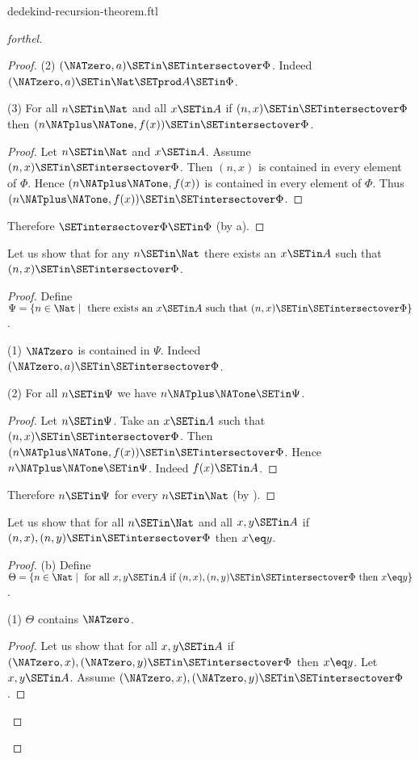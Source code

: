 \documentclass{stex}
\begin{document}
\begin{smodule}{dedekind-recursion-theorem.ftl}
\begin{proof}[forthel]
\begin{proof}
    (2) $(\NATzero, a) \SETin \SETintersectover \Phi$.
    Indeed $(\NATzero, a) \SETin \Nat \SETprod A \SETin \Phi$.

    (3) For all $n \SETin \Nat$ and all $x \SETin A$ if $(n, x) \SETin
    \SETintersectover \Phi$ then $(n \NATplus \NATone, f(x)) \SETin \SETintersectover \Phi$.
    \begin{proof}
      Let $n \SETin \Nat$ and $x \SETin A$.
      Assume $(n, x) \SETin \SETintersectover \Phi$.
      Then $(n, x)$ is contained in every element of $\Phi$.
      Hence $(n \NATplus \NATone, f(x))$ is contained in every element of $\Phi$.
      Thus $(n \NATplus \NATone, f(x)) \SETin \SETintersectover \Phi$.
    \end{proof}

    Therefore $\SETintersectover \Phi \SETin \Phi$ (by a).
  \end{proof}

  Let us show that for any $n \SETin \Nat$ there exists an $x \SETin A$ such
  that $(n, x) \SETin \SETintersectover \Phi$.
  \begin{proof}
    Define $\Psi = \{ n \in \Nat \mid \text{ there exists an }x \SETin A\text{ such
    that }(n, x) \SETin \SETintersectover \Phi \}$.

    (1) $\NATzero$ is contained in $\Psi$.
    Indeed $(\NATzero, a) \SETin \SETintersectover \Phi$.

    (2) For all $n \SETin \Psi$ we have $n \NATplus \NATone \SETin \Psi$.
    \begin{proof}
      Let $n \SETin \Psi$.
      Take an $x \SETin A$ such that $(n, x) \SETin \SETintersectover \Phi$.
      Then $(n \NATplus \NATone, f(x)) \SETin \SETintersectover \Phi$.
      Hence $n \NATplus \NATone \SETin \Psi$.
      Indeed $f(x) \SETin A$.
    \end{proof}

    Therefore $n \SETin \Psi$ for every $n \SETin \Nat$ (by ).
  \end{proof}

  Let us show that for all $n \SETin \Nat$ and all $x, y \SETin A$ if
  $(n, x), (n, y) \SETin \SETintersectover \Phi$ then $x \eq y$.
  \begin{proof}
    (b) Define $\Theta = \{ n \in \Nat \mid \text{ for all }x, y \SETin A\text{ if }
    (n, x), (n, y) \SETin \SETintersectover \Phi\text{ then }x \eq y \}$.

    (1) $\Theta$ contains $\NATzero$.
    \begin{proof}
      Let us show that for all $x, y \SETin A$ if $(\NATzero, x), (\NATzero, y) \SETin
      \SETintersectover \Phi$ then $x \eq y$.
        Let $x, y \SETin A$.
        Assume $(\NATzero, x), (\NATzero, y) \SETin \SETintersectover \Phi$.


\end{proof}
\end{proof}
\end{proof}
\end{smodule}
\end{document}
